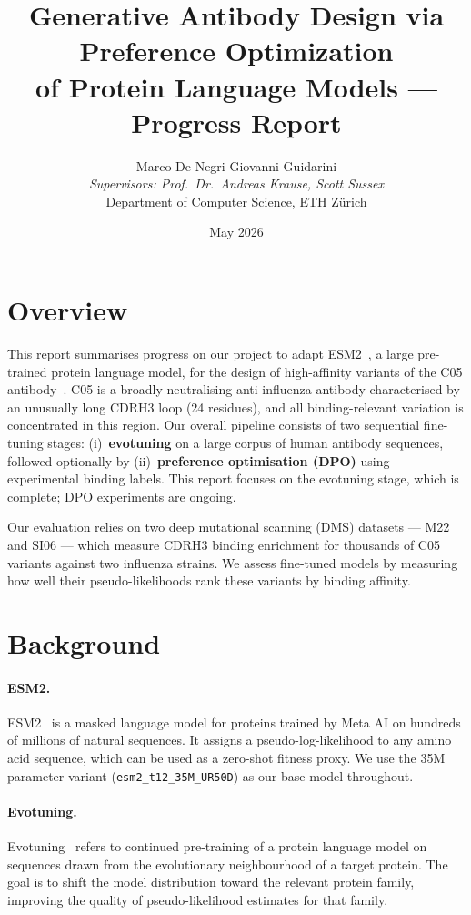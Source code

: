 \documentclass[11pt, a4paper]{article}
\title{\vspace{-1.5cm}\textbf{Generative Antibody Design via Preference Optimization\\of Protein Language Models --- Progress Report}\vspace{-0.3cm}}
\author{
    Marco De Negri \quad Giovanni Guidarini\\[0.3em]
    \textit{Supervisors: Prof.\ Dr.\ Andreas Krause, Scott Sussex}\\[0.2em]
    \small Department of Computer Science, ETH Z\"{u}rich
}
\date{May 2026}
\begin{document}
\maketitle

\section*{Overview}

This report summarises progress on our project to adapt ESM2~\cite{lin2023evolutionary}, a large pre-trained protein language model, for the design of high-affinity variants of the C05 antibody~\cite{ekiert2012cross}. C05 is a broadly neutralising anti-influenza antibody characterised by an unusually long CDRH3 loop (24 residues), and all binding-relevant variation is concentrated in this region. Our overall pipeline consists of two sequential fine-tuning stages: (i)~\textbf{evotuning} on a large corpus of human antibody sequences, followed optionally by (ii)~\textbf{preference optimisation (DPO)} using experimental binding labels. This report focuses on the evotuning stage, which is complete; DPO experiments are ongoing.

Our evaluation relies on two deep mutational scanning (DMS) datasets --- M22 and SI06 --- which measure CDRH3 binding enrichment for thousands of C05 variants against two influenza strains. We assess fine-tuned models by measuring how well their pseudo-likelihoods rank these variants by binding affinity.

\section{Background}

\paragraph{ESM2.}
ESM2~\cite{lin2023evolutionary} is a masked language model for proteins trained by Meta AI on hundreds of millions of natural sequences. It assigns a pseudo-log-likelihood to any amino acid sequence, which can be used as a zero-shot fitness proxy. We use the 35M parameter variant (\texttt{esm2\_t12\_35M\_UR50D}) as our base model throughout.

\paragraph{Evotuning.}
Evotuning~\cite{alley2019unified} refers to continued pre-training of a protein language model on sequences drawn from the evolutionary neighbourhood of a target protein. The goal is to shift the model distribution toward the relevant protein family, improving the quality of pseudo-likelihood estimates for that family.
\end{document}
